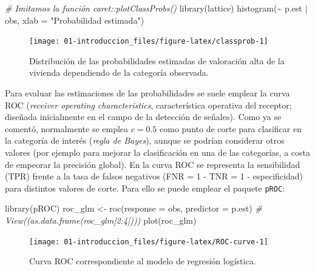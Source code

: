 \documentclass[
  spanish,
]{book}
\newenvironment{Shaded}{\begin{snugshade}}{\end{snugshade}}
\newcommand{\AttributeTok}[1]{\textcolor[rgb]{0.77,0.63,0.00}{#1}}
\newcommand{\CommentTok}[1]{\textcolor[rgb]{0.56,0.35,0.01}{\textit{#1}}}
\newcommand{\FunctionTok}[1]{\textcolor[rgb]{0.00,0.00,0.00}{#1}}
\newcommand{\NormalTok}[1]{#1}
\newcommand{\OtherTok}[1]{\textcolor[rgb]{0.56,0.35,0.01}{#1}}
\newcommand{\SpecialCharTok}[1]{\textcolor[rgb]{0.00,0.00,0.00}{#1}}
\newcommand{\StringTok}[1]{\textcolor[rgb]{0.31,0.60,0.02}{#1}}
\theoremstyle{break}
\theoremstyle{definition}
\theoremstyle{definition}
\theoremstyle{definition}
\theoremstyle{definition}
\theoremstyle{remark}
\begin{document}
\begin{Shaded}
\begin{Highlighting}[]
\CommentTok{\# Imitamos la función caret::plotClassProbs()}
\FunctionTok{library}\NormalTok{(lattice) }
\FunctionTok{histogram}\NormalTok{(}\SpecialCharTok{\textasciitilde{}}\NormalTok{ p.est }\SpecialCharTok{|}\NormalTok{ obs, }\AttributeTok{xlab =} \StringTok{"Probabilidad estimada"}\NormalTok{)}
\end{Highlighting}
\end{Shaded}

\begin{figure}[!htb]

{\centering \texttt{[image: 01-introduccion\_files/figure-latex/classprob-1]} 

}

\caption{Distribución de las probabilidades estimadas de valoración alta de la vivienda dependiendo de la categoría observada.}\label{fig:classprob}
\end{figure}

Para evaluar las estimaciones de las probabilidades se suele emplear la curva ROC (\emph{receiver operating characteristics}, característica operativa del receptor; diseñada inicialmente en el campo de la detección de señales).
Como ya se comentó, normalmente se emplea \(c = 0.5\) como punto de corte para clasificar en la categoría de interés (\emph{regla de Bayes}), aunque se podrían considerar otros valores (por ejemplo para mejorar la clasificación en una de las categorías, a costa de empeorar la precisión global).
En la curva ROC se representa la sensibilidad (TPR) frente a la tasa de falsos negativos (FNR = 1 - TNR = 1 - especificidad) para distintos valores de corte.
Para ello se puede emplear el paquete \texttt{pROC}:

\begin{Shaded}
\begin{Highlighting}[]
\FunctionTok{library}\NormalTok{(pROC)}
\NormalTok{roc\_glm }\OtherTok{\textless{}{-}} \FunctionTok{roc}\NormalTok{(}\AttributeTok{response =}\NormalTok{ obs, }\AttributeTok{predictor =}\NormalTok{ p.est)}
\CommentTok{\# View((as.data.frame(roc\_glm[2:4])))}
\FunctionTok{plot}\NormalTok{(roc\_glm)}
\end{Highlighting}
\end{Shaded}

\begin{figure}[!htb]

{\centering \texttt{[image: 01-introduccion\_files/figure-latex/ROC-curve-1]} 

}

\caption{Curva ROC correspondiente al modelo de regresión logística.}\label{fig:ROC-curve}
\end{figure}
\end{document}
